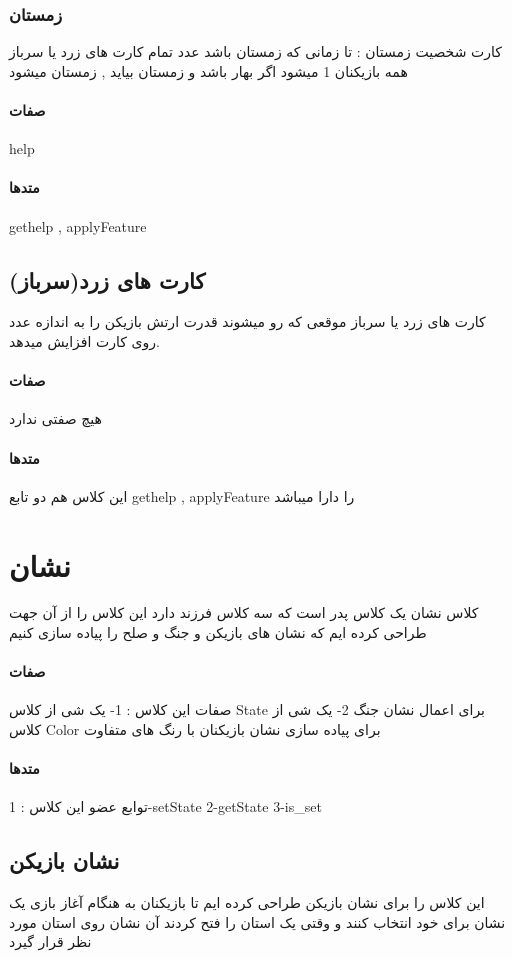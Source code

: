 \documentclass[pdf,titlepage,a4paper]{report}
\begin{document}
	\subsubsection{زمستان}
	کارت شخصیت زمستان : تا زمانی که زمستان باشد عدد تمام کارت های زرد یا سرباز همه بازیکنان 1 میشود اگر بهار باشد و زمستان بیاید , زمستان میشود
	\paragraph{صفات}
	help
	\paragraph{متدها}
	gethelp , applyFeature
	
	\subsection{کارت های زرد(سرباز)}
	کارت های زرد یا سرباز موقعی که رو میشوند قدرت ارتش بازیکن را به اندازه عدد روی کارت افزایش میدهد.

	\paragraph{صفات}
	هیچ صفتی ندارد 
	\paragraph{متدها}
	این کلاس هم دو تابع gethelp , applyFeature را دارا میباشد
	\newpage
	
	\section{نشان}
	کلاس نشان یک کلاس پدر است که سه کلاس فرزند دارد این کلاس را از آن جهت طراحی کرده ایم که نشان های بازیکن و جنگ و صلح را پیاده سازی کنیم
	\paragraph{صفات}
     صفات این کلاس :
	 1- یک شی از کلاس State  برای اعمال نشان جنگ
	 2- یک شی از کلاس Color برای پیاده سازی نشان بازیکنان با رنگ های متفاوت
	\paragraph{متدها}
	 توابع عضو این کلاس :
	 1-setState
	 2-getState
	 3-is_set 
	\subsection{نشان بازیکن}
	این کلاس را برای نشان بازیکن طراحی کرده ایم تا بازیکنان به هنگام آغاز بازی یک نشان برای خود انتخاب کنند و وقتی یک استان را فتح کردند آن نشان روی استان مورد نظر قرار گیرد
\end{document}
